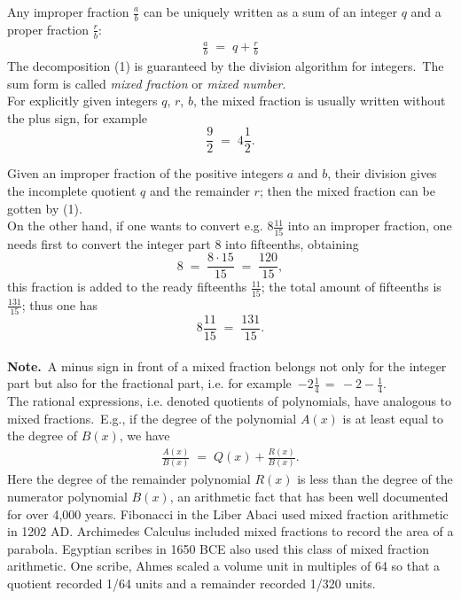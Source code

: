 \documentclass[12pt]{article}
\theoremstyle{definition}
\begin{document}
Any improper fraction $\frac{a}{b}$ can be uniquely written as a sum of an integer $q$ and a proper fraction $\frac{r}{b}$:
\begin{align}
\frac{a}{b} \;=\; q\!+\!\frac{r}{b}
\end{align}
The decomposition (1) is guaranteed by the division algorithm for integers.\, The sum form is called \emph{mixed fraction} or \emph{mixed number}.\\

For explicitly given integers $q$, $r$, $b$, the mixed fraction is usually written without the plus sign, for example
$$\frac{9}{2} \;=\; 4\frac{1}{2}.$$

Given an improper fraction of the positive integers $a$ and $b$, their division gives the incomplete quotient $q$ and the remainder $r$; then the mixed fraction can be gotten by (1).\\

On the other hand, if one wants to convert e.g. $8\frac{11}{15}$ into an improper fraction, one needs first to convert the integer part 8 into fifteenths, obtaining
$$8 \;=\; \frac{8\!\cdot\!15}{15} \;=\; \frac{120}{15},$$
this fraction is added to the ready fifteenths $\frac{11}{15}$; the total amount of fifteenths is $\frac{131}{15}$; thus one has
$$8\frac{11}{15} \;=\; \frac{131}{15}.$$\\

\textbf{Note.}\, A minus sign in front of a mixed fraction belongs not only for the integer part but also for the fractional part, i.e. for example\, $-2\frac{1}{4} \,=\, -2\!-\!\frac{1}{4}$.\\

The rational expressions, i.e. denoted quotients of polynomials, have  analogous to mixed fractions.\, E.g., if the degree of the polynomial $A(x)$ is at least equal to the degree of $B(x)$, we have
\begin{align}
\frac{A(x)}{B(x)} \;=\; Q(x)\!+\!\frac{R(x)}{B(x)}.
\end{align}
Here the degree of the remainder polynomial $R(x)$ is less than the degree of the numerator polynomial $B(x)$, an arithmetic fact that has been well documented for over 4,000 years. Fibonacci in the Liber Abaci used mixed fraction arithmetic in 1202 AD. Archimedes Calculus included mixed fractions to record the area of a parabola. Egyptian scribes in 1650 BCE also used this class of mixed fraction arithmetic. One scribe, Ahmes scaled a volume unit in multiples of 64 so that a quotient recorded 1/64 units and a remainder recorded 1/320 units. 

\end{document}
